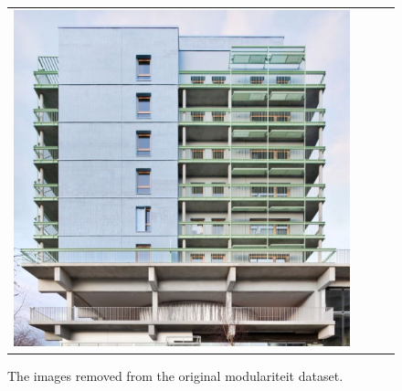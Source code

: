 \begin{figure}[H]
{\begin{tabular}{@{}cccc@{}}
      \includegraphics[width=\linewidth]{Images/LoRAs/Modulariteit/14.jpeg}\\
    \end{tabular}
  }
  \caption{The images removed from the original modulariteit dataset.}
  \label{fig:removedmodulariteit}
\end{figure}

